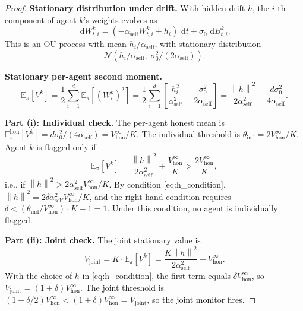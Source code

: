 \documentclass[10pt,a4paper]{amsart}
\newcommand{\E}{\mathbb{E}}
\newcommand{\dif}{\,\mathrm{d}}
\newcommand{\norm}[1]{\left\lVert #1 \right\rVert}
\begin{document}
\begin{proof}
  \textbf{Stationary distribution under drift.}
  With hidden drift $h$, the $i$-th component of agent $k$'s weights
  evolves as
  \[
    \dif W^k_{t,i} = (-\alpha_{\mathrm{self}} W^k_{t,i} + h_i)\,\dif t
    + \sigma_0\,\dif B^k_{t,i}.
  \]
  This is an OU process with mean $h_i/\alpha_{\mathrm{self}}$, with
  stationary distribution
  \[
    \mathcal{N}\!\left(h_i/\alpha_{\mathrm{self}},\; \sigma_0^2/(2\alpha_{\mathrm{self}})\right).
  \]

  \textbf{Stationary per-agent second moment.}
  \[
    \E_\pi[V^k] = \frac{1}{2}\sum_{i=1}^d \E_\pi[(W^k_i)^2]
    = \frac{1}{2}\sum_{i=1}^d \left[\frac{h_i^2}{\alpha_{\mathrm{self}}^2}
    + \frac{\sigma_0^2}{2\alpha_{\mathrm{self}}}\right]
    = \frac{\norm{h}^2}{2\alpha_{\mathrm{self}}^2}
    + \frac{d\sigma_0^2}{4\alpha_{\mathrm{self}}}.
  \]

  \textbf{Part (i): Individual check.}
  The per-agent honest mean is
  $\E_\pi^{\mathrm{hon}}[V^k] = d\sigma_0^2/(4\alpha_{\mathrm{self}})
  = V^\infty_{\mathrm{hon}}/K$.
  The individual threshold is $\theta_{\mathrm{ind}} = 2V^\infty_{\mathrm{hon}}/K$.
  Agent $k$ is flagged only if
  \[
    \E_\pi[V^k] = \frac{\norm{h}^2}{2\alpha_{\mathrm{self}}^2}
    + \frac{V^\infty_{\mathrm{hon}}}{K}
    > \frac{2V^\infty_{\mathrm{hon}}}{K},
  \]
  i.e., if $\norm{h}^2 > 2\alpha_{\mathrm{self}}^2 V^\infty_{\mathrm{hon}} / K$.
  By condition \eqref{eq:h_condition},
  $\norm{h}^2 = 2\delta\alpha_{\mathrm{self}}^2 V^\infty_{\mathrm{hon}} / K$,
  and the right-hand condition requires
  $\delta < (\theta_{\mathrm{ind}}/V^\infty_{\mathrm{hon}})\cdot K - 1
  = 1$.  Under this condition, no agent is individually flagged.

  \textbf{Part (ii): Joint check.}
  The joint stationary value is
  \[
    V_{\mathrm{joint}} = K \cdot \E_\pi[V^k]
    = \frac{K\norm{h}^2}{2\alpha_{\mathrm{self}}^2}
    + V^\infty_{\mathrm{hon}}.
  \]
  With the choice of $h$ in \eqref{eq:h_condition},
  the first term equals $\delta V^\infty_{\mathrm{hon}}$, so
  $V_{\mathrm{joint}} = (1 + \delta) V^\infty_{\mathrm{hon}}$.
  The joint threshold is $(1+\delta/2) V^\infty_{\mathrm{hon}} <
  (1+\delta) V^\infty_{\mathrm{hon}} = V_{\mathrm{joint}}$, so the
  joint monitor fires.
\end{proof}
\end{document}
